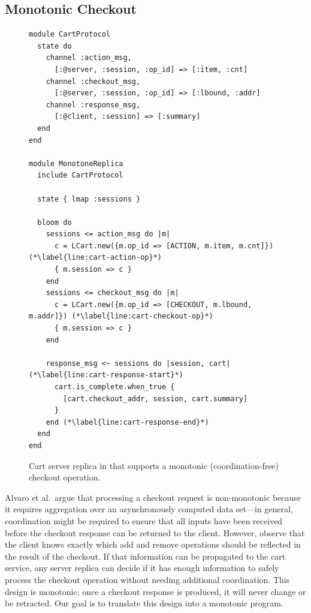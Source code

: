 \subsection{Monotonic Checkout}
\label{sec:monotone-checkout}

\begin{figure}[t]
\begin{scriptsize}
\begin{lstlisting}
module CartProtocol
  state do
    channel :action_msg,
      [:@server, :session, :op_id] => [:item, :cnt]
    channel :checkout_msg,
      [:@server, :session, :op_id] => [:lbound, :addr]
    channel :response_msg,
      [:@client, :session] => [:summary]
  end
end

module MonotoneReplica
  include CartProtocol

  state { lmap :sessions }

  bloom do
    sessions <= action_msg do |m|
      c = LCart.new({m.op_id => [ACTION, m.item, m.cnt]}) (*\label{line:cart-action-op}*)
      { m.session => c }
    end
    sessions <= checkout_msg do |m|
      c = LCart.new({m.op_id => [CHECKOUT, m.lbound, m.addr]}) (*\label{line:cart-checkout-op}*)
      { m.session => c }
    end

    response_msg <~ sessions do |session, cart| (*\label{line:cart-response-start}*)
      cart.is_complete.when_true {
        [cart.checkout_addr, session, cart.summary]
      }
    end (*\label{line:cart-response-end}*)
  end
end
\end{lstlisting}
\end{scriptsize}
\caption{Cart server replica in \lang that supports a monotonic
  (coordination-free) checkout operation.}
\label{fig:monotone-cart}
\end{figure}

Alvaro et al.\ argue that processing a checkout request is non-monotonic because
it requires aggregation over an asynchronously computed data set---in general,
coordination might be required to ensure that all inputs have been received
before the checkout response can be returned to the client. However, observe
that the client knows exactly which add and remove operations should be
reflected in the result of the checkout. If that information can be propagated
to the cart service, any server replica can decide if it has enough information
to safely process the checkout operation without needing additional
coordination. This design is monotonic: once a checkout response is produced, it
will never change or be retracted. Our goal is to translate this design into a
monotonic \lang program.

